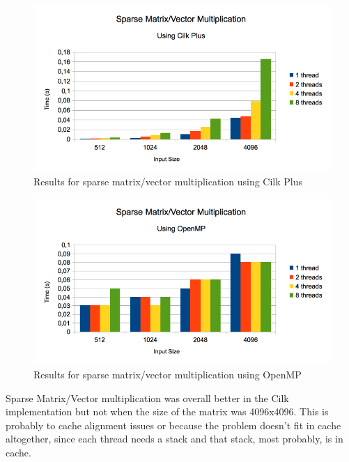 \documentclass[a4paper,10pt,openright,openbib,twocolumn]{article}
\begin{document}
        \begin{figure}[H]
            \centering
            \includegraphics[scale=0.45]{images/matvectcilk.png}
            \caption{Results for sparse matrix/vector multiplication using Cilk Plus}
            \label{roofline}
        \end{figure}
        \begin{figure}[H]
            \centering
            \includegraphics[scale=0.45]{images/matvectopenmp.png}
            \caption{Results for sparse matrix/vector multiplication using OpenMP}
            \label{roofline}
        \end{figure}
        Sparse Matrix/Vector multiplication was overall better in the Cilk implementation but not when the size of the matrix was 4096x4096. This is probably to cache alignment issues or because the problem doesn't fit in cache altogether, since each thread needs a stack and that stack, most probably, is in cache. \\
\end{document}
